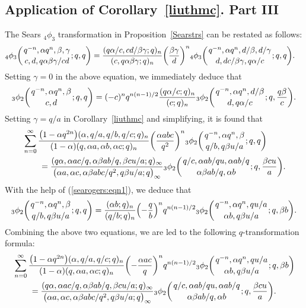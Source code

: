 \documentclass[pdftex]{sigma}
\numberwithin{equation}{section}
\begin{document}
\subsection{Application of Corollary~\ref{liuthmc}. Part III}
The Sears $_4\phi_3$ transformation in Proposition~\ref{Searstrs} can be restated as follows:
\begin{align*}
	&{_4\phi_3} \biggl({{q^{-n}, \alpha q^n, \beta, \gamma} \atop {c, d, q\alpha \beta \gamma/cd}} ; q, q \biggr)
	=\frac{(q\alpha/c, cd/\beta \gamma; q)_n}{(c, q\alpha \beta \gamma; q)_n} \biggl(\frac{\beta \gamma}{d}\biggr)^n
	{_4\phi_3} \biggl({{q^{-n}, \alpha q^n, d/\beta, d/\gamma} \atop {d, dc/\beta \gamma, q\alpha/c}} ; q, q \biggr).
\end{align*}
Setting $\gamma=0$ in the above equation, we immediately deduce that
\begin{align}\label{searogers:eqn1}
	{_3\phi_2} \biggl({{q^{-n}, \alpha q^n, \beta} \atop {c, d}} ; q, q \biggr)
	=(-c)^n q^{n(n-1)/2} \frac{(q\alpha/c; q)_n}{(c; q)_n}
	{_3\phi_2} \biggl({{q^{-n}, \alpha q^n, d/\beta} \atop {d, q\alpha/c}} ; q, \frac{q\beta}{c} \biggr).
\end{align}
Setting $\gamma=q/{a}$ in Corollary~\ref{liuthmc} and simplifying, it is found that
\begin{align*}%
	&\sum_{n=0}^\infty \frac{\bigl(1-\alpha q^{2n}\bigr)(\alpha, q/a, q/b, q/c; q)_n}{(1-\alpha)(q, \alpha a, \alpha b, \alpha c; q)_n}\biggl(\frac{\alpha abc}{q^2}\biggr)^n
 {_3\phi_2}\biggl({{q^{-n}, \alpha q^n, \beta}
		\atop{q/b, q\beta u/a}}; q, q\biggr)\\
	&\qquad{}=\frac{(q\alpha, \alpha ac/q, \alpha \beta ab/q, \beta cu/a; q )_\infty}{\bigl(\alpha a, \alpha c, \alpha \beta abc/q^2, q\beta u/a; q \bigr)_\infty}{_3\phi_2} \biggl({{q/c, \alpha ab/qu, \alpha ab/q}\atop{\alpha \beta ab/q, \alpha b}}; q, \frac{\beta cu}{a} \biggr).\nonumber
\end{align*}
With the help of (\ref{searogers:eqn1}), we deduce that
\begin{align*}%
{_3\phi_2}\biggl({{q^{-n}, \alpha q^n, \beta}
	\atop{q/b, q\beta u/a}}; q, q\biggr)
=\frac{(\alpha b; q)_n}{(q/b; q)_n} \Bigl(-\frac{q}{b}\Bigr)^n q^{n(n-1)/2} {_3\phi_2}\biggl({{q^{-n}, \alpha q^n, qu/a}
	\atop{\alpha b, q\beta u/a}}; q, \beta b\biggr).
\end{align*}
Combining the above two equations, we are led to the following $q$-transformation formula:
\begin{align*}%
	&\sum_{n=0}^\infty \frac{\bigl(1-\alpha q^{2n}\bigr)(\alpha, q/a, q/c; q)_n}{(1-\alpha)(q, \alpha a, \alpha c; q)_n}\biggl(-\frac{\alpha ac}{q}\biggr)^n q^{n(n-1)/2} {_3\phi_2}\biggl({{q^{-n}, \alpha q^n, qu/a}\atop{\alpha b, q\beta u/a}}; q, \beta b\biggr)\\
	&\qquad=\frac{(q\alpha, \alpha ac/q, \alpha \beta ab/q, \beta cu/a; q )_\infty}{\bigl(\alpha a, \alpha c, \alpha \beta abc/q^2, q\beta u/a; q \bigr)_\infty}{_3\phi_2} \biggl({{q/c, \alpha ab/qu, \alpha ab/q}\atop{\alpha \beta ab/q, \alpha b}}; q, \frac{\beta cu}{a} \biggr).\nonumber
\end{align*}
\end{document}
